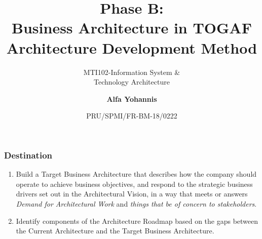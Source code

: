 \documentclass[aspectratio=169, table]{beamer}
\subtitle{MTI102-Information System \&\\Technology Architecture}
\title{Phase B:\\Business Architecture in TOGAF\\
     Architecture Development Method}
\date[Serial]{\scriptsize {PRU/SPMI/FR-BM-18/0222}}
\author[Pradita]{\small {\textbf{Alfa Yohannis}}}
\begin{document}
    \frame{\titlepage}

    \begin{frame}
        \frametitle{Destination}
        \begin{enumerate}
            \item Build a Target Business Architecture that describes how the company should operate to achieve business objectives, and respond to the strategic business drivers set out in the Architectural Vision, in a way that meets or answers \textit{Demand for Architectural Work} and \textit{things that be of concern to stakeholders}.

            \item Identify components of the Architecture Roadmap based on the gaps between the Current Architecture and the Target Business Architecture.
        \end{enumerate}
    \end{frame}
\end{document}
